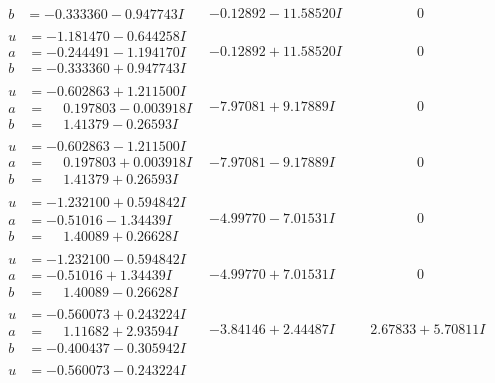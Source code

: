 \documentclass[1p]{elsarticle_modified}
\theoremstyle{definition}
\begin{document}
$$\begin{array}{c|c|c}
\begin{aligned}
b &= -0.333360 - 0.947743 I\end{aligned}
 & -0.12892 - 11.58520 I & \phantom{-0.000000 } 0 \\ \hline\begin{aligned}
u &= -1.181470 - 0.644258 I \\
a &= -0.244491 - 1.194170 I \\
b &= -0.333360 + 0.947743 I\end{aligned}
 & -0.12892 + 11.58520 I & \phantom{-0.000000 } 0 \\ \hline\begin{aligned}
u &= -0.602863 + 1.211500 I \\
a &= \phantom{-}0.197803 - 0.003918 I \\
b &= \phantom{-}1.41379 - 0.26593 I\end{aligned}
 & -7.97081 + 9.17889 I & \phantom{-0.000000 } 0 \\ \hline\begin{aligned}
u &= -0.602863 - 1.211500 I \\
a &= \phantom{-}0.197803 + 0.003918 I \\
b &= \phantom{-}1.41379 + 0.26593 I\end{aligned}
 & -7.97081 - 9.17889 I & \phantom{-0.000000 } 0 \\ \hline\begin{aligned}
u &= -1.232100 + 0.594842 I \\
a &= -0.51016 - 1.34439 I \\
b &= \phantom{-}1.40089 + 0.26628 I\end{aligned}
 & -4.99770 - 7.01531 I & \phantom{-0.000000 } 0 \\ \hline\begin{aligned}
u &= -1.232100 - 0.594842 I \\
a &= -0.51016 + 1.34439 I \\
b &= \phantom{-}1.40089 - 0.26628 I\end{aligned}
 & -4.99770 + 7.01531 I & \phantom{-0.000000 } 0 \\ \hline\begin{aligned}
u &= -0.560073 + 0.243224 I \\
a &= \phantom{-}1.11682 + 2.93594 I \\
b &= -0.400437 - 0.305942 I\end{aligned}
 & -3.84146 + 2.44487 I & \phantom{-}2.67833 + 5.70811 I \\ \hline\begin{aligned}
u &= -0.560073 - 0.243224 I \\

\end{aligned}
\end{array}$$
\end{document}
